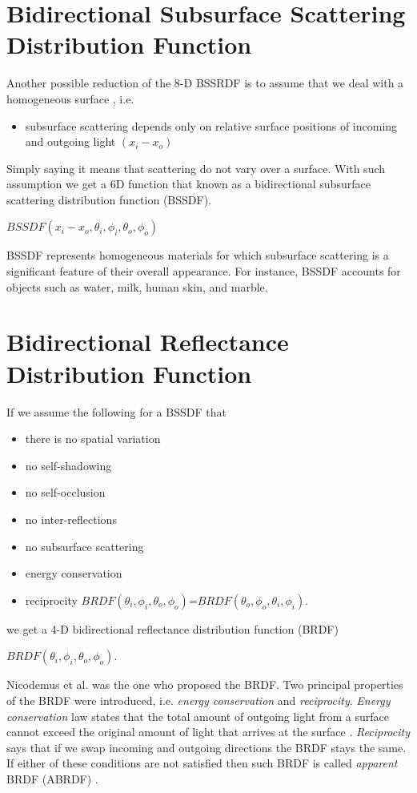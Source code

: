 \section{Bidirectional Subsurface Scattering Distribution Function}
\label{section:BSSDF}

Another possible reduction of the 8-D BSSRDF is to assume that we deal with a homogeneous surface \cite{dong}, i.e.
\begin{itemize}
 \item subsurface scattering depends only on relative surface positions of incoming and outgoing light $(x_{i}-x_{o})$
\end{itemize}
  Simply saying it means that scattering do not vary over a surface.
 With such assumption we get a 6D function that known as a bidirectional subsurface scattering
distribution function (BSSDF).
 \begin{center}
$BSSDF(x_{i}-x_{o},\theta_{i} ,\phi_{i},\theta_{o} ,\phi_{o})$
 \end{center}
 BSSDF represents homogeneous materials for which subsurface scattering is a significant feature of their overall appearance.
 For instance, BSSDF accounts for objects such as water, milk, human skin, and marble.

\section{Bidirectional Reflectance Distribution Function}
\label{section:brdf}

If we assume the following for a BSSDF that

\begin{itemize}
 \item there is no spatial variation 
 \item no self-shadowing
 \item no self-occlusion
 \item no inter-reflections
 \item no subsurface scattering
 \item energy conservation
 \item reciprocity  $BRDF(\theta_{i} ,\phi_{i},\theta_{o} ,\phi_{o})$=$BRDF(\theta_{o} ,\phi_{o},\theta_{i} ,\phi_{i})$.
\end{itemize}

 we get a 4-D bidirectional reflectance distribution function (BRDF)
 \begin{center}
$BRDF(\theta_{i} ,\phi_{i},\theta_{o} ,\phi_{o})$.
 \end{center}
Nicodemus et al. \cite{Nicodemus} was the one who proposed the BRDF. 
Two principal properties of the BRDF were introduced, i.e. \emph{energy conservation} and \emph{reciprocity}. 
\emph{Energy conservation} law states that the total amount of outgoing light from a surface cannot exceed the
original amount of light that arrives at the surface \cite{wynn}. 
 \emph{Reciprocity} says that if we swap incoming and outgoing directions the BRDF stays the same.
If either of these conditions are not satisfied then such BRDF is called \emph{apparent} BRDF (ABRDF) \cite{abrdf}.

